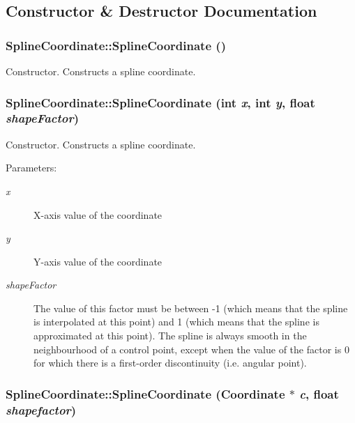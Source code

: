 \subsection{Constructor \& Destructor Documentation}
\subsubsection{\setlength{\rightskip}{0pt plus 5cm}Spline\-Coordinate::Spline\-Coordinate ()}\label{classSplineCoordinate_a0}


Constructor. Constructs a spline coordinate. 
\subsubsection{\setlength{\rightskip}{0pt plus 5cm}Spline\-Coordinate::Spline\-Coordinate (int {\em x}, int {\em y}, float {\em shape\-Factor})}\label{classSplineCoordinate_a1}


Constructor. Constructs a spline coordinate. \begin{Desc}
\item[Parameters: ]\par
\begin{description}
\item[{\em 
x}]X-axis value of the coordinate \item[{\em 
y}]Y-axis value of the coordinate \item[{\em 
shape\-Factor}]The value of this factor must be between -1 (which means that the spline is interpolated at this point) and 1 (which means that the spline is approximated at this point). The spline is always smooth in the neighbourhood of a control point, except when the value of the factor is 0 for which there is a first-order discontinuity (i.e. angular point). \end{description}
\end{Desc}
\subsubsection{\setlength{\rightskip}{0pt plus 5cm}Spline\-Coordinate::Spline\-Coordinate ({\bf Coordinate} $\ast$ {\em c}, float {\em shapefactor})}\label{classSplineCoordinate_a2}



